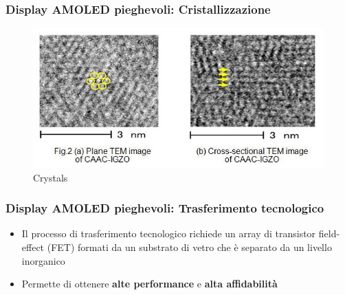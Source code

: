 \documentclass[12pt]{beamer}
\begin{document}
	\begin{frame}
		\frametitle{Display AMOLED pieghevoli: Cristallizzazione}
		\begin{figure}
			\centering
			\includegraphics[width=1\linewidth]{IMMAGINI/immagine_cristalizzazione}
			\caption{Crystals}
			\label{fig:immaginecristalizzazione}
		\end{figure}
	\end{frame}
	\begin{frame}
		\frametitle{Display AMOLED pieghevoli: Trasferimento tecnologico}
		\begin{itemize}
			\item Il processo di trasferimento tecnologico richiede un array di transistor field-effect (FET) formati da un substrato di vetro che è separato da un livello inorganico
			\pause
			\item  Permette di ottenere \textbf{alte performance} e \textbf{alta affidabilità}	
		\end{itemize}
	\end{frame}
\end{document}
